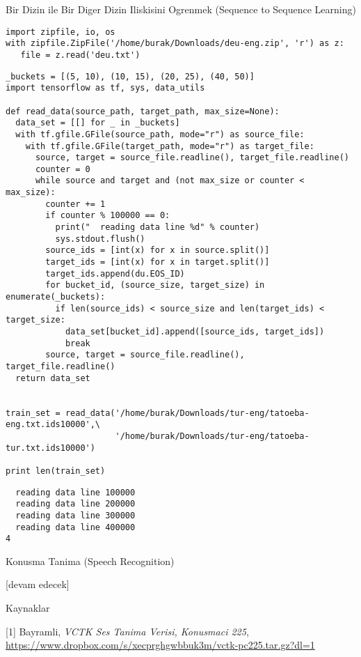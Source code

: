 \documentclass[12pt,fleqn]{article}\usepackage{../../common}
\begin{document}
Bir Dizin ile Bir Diger Dizin Iliskisini Ogrenmek (Sequence to Sequence Learning)

\begin{verbatim}
import zipfile, io, os
with zipfile.ZipFile('/home/burak/Downloads/deu-eng.zip', 'r') as z:
   file = z.read('deu.txt')
\end{verbatim}

\begin{verbatim}
_buckets = [(5, 10), (10, 15), (20, 25), (40, 50)]
import tensorflow as tf, sys, data_utils

def read_data(source_path, target_path, max_size=None):
  data_set = [[] for _ in _buckets]
  with tf.gfile.GFile(source_path, mode="r") as source_file:
    with tf.gfile.GFile(target_path, mode="r") as target_file:
      source, target = source_file.readline(), target_file.readline()
      counter = 0
      while source and target and (not max_size or counter < max_size):
        counter += 1
        if counter % 100000 == 0:
          print("  reading data line %d" % counter)
          sys.stdout.flush()
        source_ids = [int(x) for x in source.split()]
        target_ids = [int(x) for x in target.split()]
        target_ids.append(du.EOS_ID)
        for bucket_id, (source_size, target_size) in enumerate(_buckets):
          if len(source_ids) < source_size and len(target_ids) < target_size:
            data_set[bucket_id].append([source_ids, target_ids])
            break
        source, target = source_file.readline(), target_file.readline()
  return data_set


train_set = read_data('/home/burak/Downloads/tur-eng/tatoeba-eng.txt.ids10000',\
                      '/home/burak/Downloads/tur-eng/tatoeba-tur.txt.ids10000')

print len(train_set)
\end{verbatim}

\begin{verbatim}
  reading data line 100000
  reading data line 200000
  reading data line 300000
  reading data line 400000
4
\end{verbatim}

















Konusma Tanima (Speech Recognition)












[devam edecek]

Kaynaklar

[1] Bayramli, {\em VCTK Ses Tanima Verisi, Konusmaci 225}, \url{https://www.dropbox.com/s/xecprghgwbbuk3m/vctk-pc225.tar.gz?dl=1}
\end{document}
